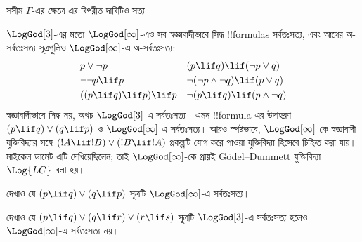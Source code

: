\documentclass[../../../include/open-logic-section]{subfiles}
\begin{document}
সসীম $\Gamma$-এর ক্ষেত্রে এর বিপরীত দাবিটিও সত্য।

$\LogGod[3]$-এর মতো $\LogGod[\infty]$-এও সব স্বজ্ঞাবাদীভাবে সিদ্ধ
!!{formula}s সর্বতঃসত্য, এবং আগের অ-সর্বতঃসত্য সূত্রগুলিও
$\LogGod[\infty]$-এ অ-সর্বতঃসত্য:
\begin{align*}
  & p \lor \lnot p && (p \lif q) \lif (\lnot p \lor q) \\
  & \lnot\lnot p \lif p && \lnot(\lnot p \land \lnot q) \lif (p \lor q) \\
  & ((p \lif q) \lif p) \lif p && \lnot(p \lif q) \lif (p \land \lnot q)
\end{align*}
স্বজ্ঞাবাদীভাবে সিদ্ধ নয়, অথচ $\LogGod[3]$-এ সর্বতঃসত্য---এমন
!!{formula}-এর উদাহরণ $(p \lif q) \lor (q \lif p)$-ও
$\LogGod[\infty]$-এ সর্বতঃসত্য। আরও স্পষ্টভাবে,
$\LogGod[\infty]$-কে স্বজ্ঞাবাদী যুক্তিবিদ্যার সঙ্গে
$(!A \lif !B) \lor (!B \lif !A)$ প্রকল্পটি যোগ করে পাওয়া
যুক্তিবিদ্যা হিসেবে চিহ্নিত করা যায়। মাইকেল ডামেট এটি দেখিয়েছিলেন;
তাই $\LogGod[\infty]$-কে প্রায়ই G\"odel--Dummett
যুক্তিবিদ্যা~$\Log{LC}$ বলা হয়।

\begin{prob}
  দেখাও যে $(p \lif q) \lor (q \lif p)$ সূত্রটি
  $\LogGod[\infty]$-এ সর্বতঃসত্য।
\end{prob}

\begin{prob}
  দেখাও যে $(p \lif q) \lor (q \lif r) \lor (r \lif s)$ সূত্রটি
  $\LogGod[3]$-এ সর্বতঃসত্য হলেও $\LogGod[\infty]$-এ
  সর্বতঃসত্য নয়।
\end{prob}
\end{document}
